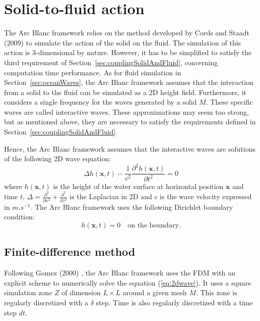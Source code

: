 \documentclass[11pt]{article}
\def\Framework{The Arc Blanc framework\xspace}
\def\framework{the Arc Blanc framework\xspace}
\begin{document}
\section{Solid-to-fluid action}
\label{sec:solidToFluidAction}
\Framework relies on the method developed by Cords and Staadt (2009) \cite{cordsRealTimeOpenWater2009} to simulate the action of the solid on the fluid.
The simulation of this action is 3-dimensional by nature.
However, it has to be simplified to satisfy the third requirement of Section~\ref{sec:couplingSolidAndFluid}, concerning computation time performance.
As for fluid simulation in Section~\ref{sec:oceanWaves}, \framework assumes that the interaction from a solid to the fluid can be simulated as a 2D height field.
Furthermore, it considers a single frequency for the waves generated by a solid $M$.
These specific waves are called interactive waves.
These approximations may seem too strong, but as mentioned above, they are necessary to satisfy the requirements defined in Section~\ref{sec:couplingSolidAndFluid}.

Hence, \framework assumes that the interactive waves are solutions of the following 2D wave equation:
\begin{equation}
	\label{eq:2dwave}
	\Delta h(\mathbf x,t)-\frac{1}{c^2}\frac{\partial^2 h(\mathbf x,t)}{\partial t^2}=0
\end{equation}
where $h(\mathbf x,t)$ is the height of the water surface at horizontal position $\mathbf x$ and time $t$, $\Delta=\frac{\partial^2}{\partial x^2}+\frac{\partial^2}{\partial z^2}$ is the Laplacian in 2D and $c$ is the wave velocity expressed in $m.s^{-1}$.
\Framework uses the following Dirichlet boundary condition:
\begin{equation}
	h(\mathbf x,t) = 0 \text{~~~on the boundary.}
\end{equation}

\subsection{Finite-difference method}
\label{subsec:finiteDifferenceMethod}
Following Gomez (2000) \cite{gomezInteractiveSimulationWater2000},
\framework uses the FDM with an explicit scheme to numerically solve the equation (\ref{eq:2dwave}).
It uses a square simulation zone $Z$ of dimension $L\times L$ around a given mesh $M$.
This zone is regularly discretized with a $\delta$ step.
Time is also regularly discretized with a time step $dt$.
\end{document}
